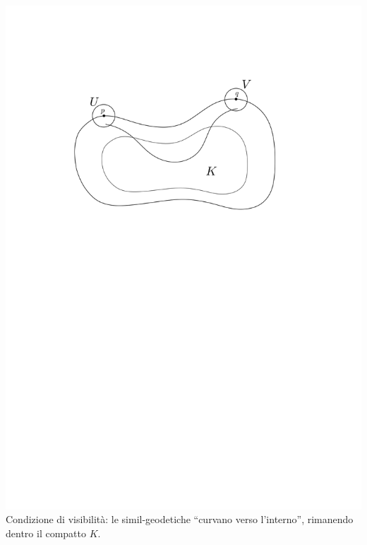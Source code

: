 \begin{frame}[t]
{    \includegraphics[width=1.05\textwidth, trim=0 16cm 0 3cm]{vis1.png}
    Condizione di visibilità: le simil-geodetiche ``curvano verso l'interno'', rimanendo dentro il compatto $K$.
  }
\end{frame}